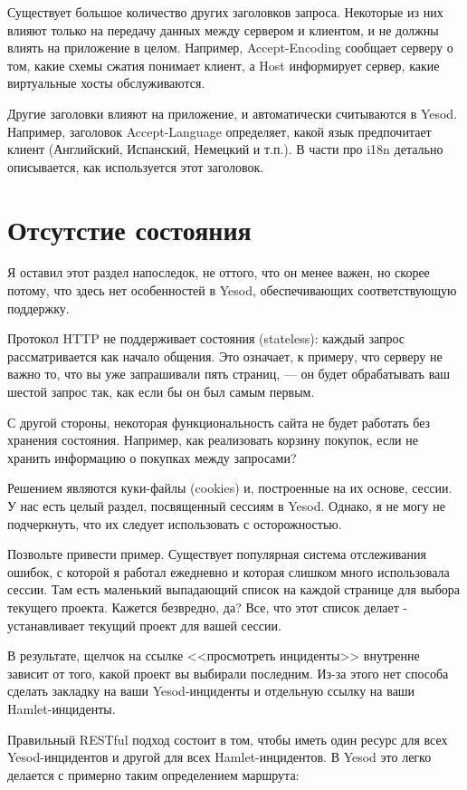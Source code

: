 Существует большое количество других заголовков запроса. Некоторые из них влияют только на передачу данных между сервером и клиентом, и не должны влиять на приложение в целом. Например, Accept-Encoding сообщает серверу о том, какие схемы сжатия понимает клиент, а Host информирует сервер, какие виртуальные хосты обслуживаются.

Другие заголовки влияют на приложение, и автоматически считываются в Yesod. Например, заголовок Accept-Language определяет, какой язык предпочитает клиент (Английский, Испанский, Немецкий и т.п.). В части про i18n детально описывается, как используется этот заголовок.

\section{Отсутстие состояния}

Я оставил этот раздел напоследок, не оттого, что он менее важен, но скорее потому, что здесь нет особенностей в Yesod, обеспечивающих соответствующую поддержку.

Протокол HTTP не поддерживает состояния (stateless): каждый запрос рассматривается как начало общения. Это означает, к примеру, что серверу не важно то, что вы уже запрашивали пять страниц, --- он будет обрабатывать ваш шестой запрос так, как если бы он был самым первым.

С другой стороны, некоторая функциональность сайта не будет работать без хранения состояния. Например, как реализовать корзину покупок, если не хранить информацию о покупках между запросами?

Решением являются куки-файлы (cookies) и, построенные на их основе, сессии. У нас есть целый раздел, посвященный сессиям в Yesod. Однако, я не могу не подчеркнуть, что их следует использовать с осторожностью.

Позвольте привести пример. Существует популярная система отслеживания ошибок, с которой я работал ежедневно и которая слишком много использовала сессии. Там есть маленький выпадающий список на каждой странице для выбора текущего проекта. Кажется безвредно, да? Все, что этот список делает - устанавливает текущий проект для вашей сессии.

В результате, щелчок на ссылке <<просмотреть инциденты>> внутренне зависит от того, какой проект вы выбирали последним. Из-за этого нет способа сделать закладку на ваши Yesod-инциденты и отдельную ссылку на ваши Hamlet-инциденты.

Правильный RESTful подход состоит в том, чтобы иметь один ресурс для всех Yesod-инцидентов и другой для всех Hamlet-инцидентов. В Yesod это легко делается с примерно таким определением маршрута:


